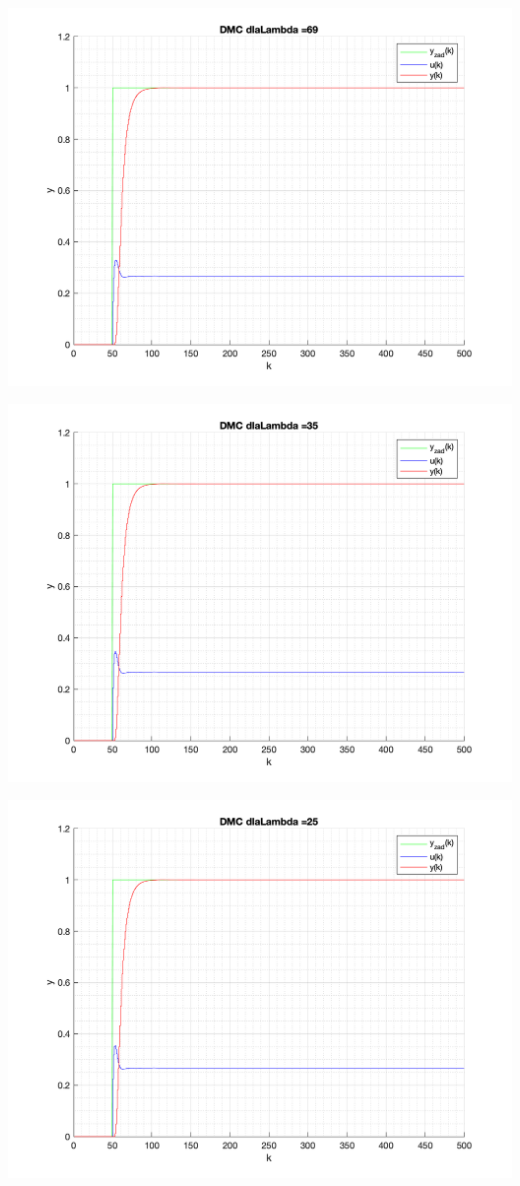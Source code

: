 \documentclass[a4paper, 11pt]{article}
\begin{document}
\begin{enumerate}
 \includegraphics[width=\linewidth]{./ModelsP4_Lambda/P4_DMC_Lambda_69_png.png} 
 
 \includegraphics[width=\linewidth]{./ModelsP4_Lambda/P4_DMC_Lambda_35_png.png} 
 
 \includegraphics[width=\linewidth]{./ModelsP4_Lambda/P4_DMC_Lambda_25_png.png} 
 

\end{enumerate}
\end{document}
